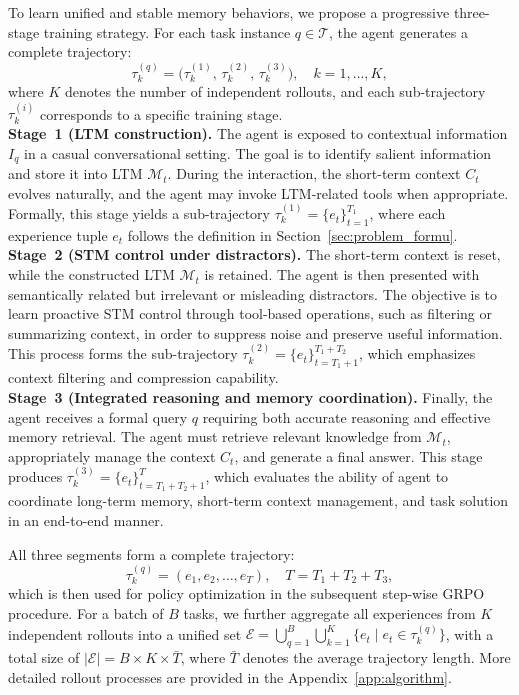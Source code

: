 To learn unified and stable memory behaviors, we propose a progressive three-stage training strategy. 
For each task instance $q \in \mathcal{T}$, the agent generates a complete trajectory:
\begin{equation}
\tau_k^{(q)} = \big(\tau_k^{(1)}, \, \tau_k^{(2)}, \, \tau_k^{(3)}\big), \quad k = 1, \dots, K,
\end{equation}
where $K$ denotes the number of independent rollouts, and each sub-trajectory $\tau_k^{(i)}$ corresponds to a specific training stage. 
\\
\textbf{Stage~1 (LTM construction).}  
The agent is exposed to contextual information $I_q$ in a casual conversational setting. 
The goal is to identify salient information and store it into LTM $\mathcal{M}_t$. 
During the interaction, the short-term context $C_t$ evolves naturally, and the agent may invoke LTM-related tools when appropriate.
Formally, this stage yields a sub-trajectory $\tau_k^{(1)} = \{e_t\}_{t=1}^{T_1}$,
where each experience tuple $e_t$ follows the definition in Section~\ref{sec:problem_formu}.
\\
\textbf{Stage~2 (STM control under distractors).}  
The short-term context is reset, while the constructed LTM $\mathcal{M}_t$ is retained. The agent is then presented with semantically related but irrelevant or misleading distractors. 
The objective is to learn proactive STM control through tool-based operations, such as filtering or summarizing context, in order to suppress noise and preserve useful information.
This process forms the sub-trajectory $\tau_k^{(2)} = \{e_t\}_{t=T_1+1}^{T_1+T_2}$,
which emphasizes context filtering and compression capability.
\\
\textbf{Stage~3 (Integrated reasoning and memory coordination).}  
Finally, the agent receives a formal query $q$ requiring both accurate reasoning and effective memory retrieval. 
The agent must retrieve relevant knowledge from $\mathcal{M}_t$, appropriately manage the context $C_t$, and generate a final answer.
This stage produces $\tau_k^{(3)} = \{e_t\}_{t=T_1+T_2+1}^{T}$,
which evaluates the ability of agent to coordinate long-term memory, short-term context management, and task solution in an end-to-end manner.

All three segments form a complete trajectory:
\begin{equation}
    \tau_k^{(q)}=(e_1, e_2, \ldots, e_T),\quad T = T_1 + T_2 + T_3,
\end{equation}
which is then used for policy optimization in the subsequent step-wise GRPO procedure. For a batch of $B$ tasks, we further aggregate all experiences from $K$ independent rollouts into a unified set $\mathcal{E} = \bigcup_{q=1}^{B} \bigcup_{k=1}^{K} \{ e_t \mid e_t \in \tau_k^{(q)} \}$, with a total size of $|\mathcal{E}| = B \times K \times \bar{T}$, where $\bar{T}$ denotes the average trajectory length. More detailed rollout processes are provided in the Appendix~\ref{app:algorithm}.

